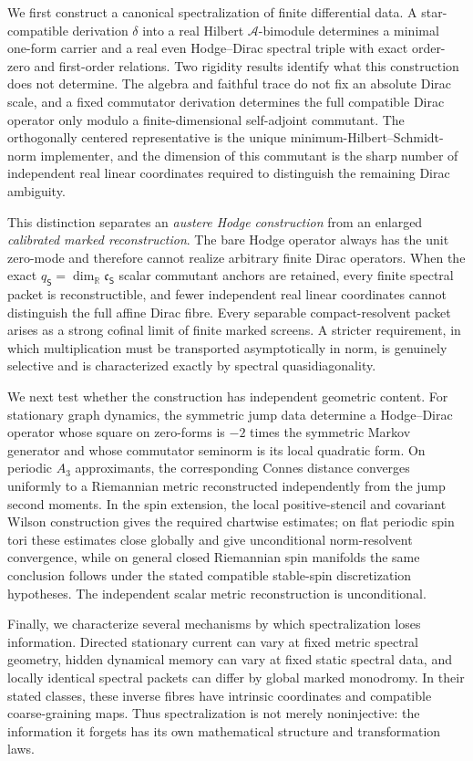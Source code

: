\documentclass[11pt]{article}
\theoremstyle{definition}
\theoremstyle{remark}
\theoremstyle{definition}
\theoremstyle{remark}
\newcommand{\R}{\mathbb R}
\newcommand{\A}{\mathcal A}
\begin{document}
We first construct a canonical spectralization of finite differential data. A
star-compatible derivation $\delta$ into a real Hilbert $\A$-bimodule determines
a minimal one-form carrier and a real even Hodge--Dirac spectral triple with exact
order-zero and first-order relations. Two rigidity results identify what this
construction does not determine. The algebra and faithful trace do not fix an
absolute Dirac scale, and a fixed commutator derivation determines the full
compatible Dirac operator only modulo a finite-dimensional self-adjoint commutant.
The orthogonally centered representative is the unique
minimum-Hilbert--Schmidt-norm implementer, and the dimension of this commutant is
the sharp number of independent real linear coordinates required to distinguish the
remaining Dirac ambiguity.

This distinction separates an \emph{austere Hodge construction} from an enlarged
\emph{calibrated marked reconstruction}. The bare Hodge operator always has the
unit zero-mode and therefore cannot realize arbitrary finite Dirac operators.
When the exact $q_{\mathsf S}=\dim_{\R}\mathfrak c_{\mathsf S}$ scalar
commutant anchors are retained, every finite spectral packet is reconstructible,
and fewer independent real linear coordinates cannot distinguish the full affine Dirac fibre.  Every
separable compact-resolvent packet arises as a strong cofinal limit of finite
marked screens. A stricter requirement,
in which multiplication must be transported asymptotically in norm, is genuinely
selective and is characterized exactly by spectral quasidiagonality.

We next test whether the construction has independent geometric content. For
stationary graph dynamics, the symmetric jump data determine a Hodge--Dirac
operator whose square on zero-forms is $-2$ times the symmetric Markov generator and whose commutator
seminorm is its local quadratic form. On periodic $A_3$ approximants, the
corresponding Connes distance converges uniformly to a Riemannian metric
reconstructed independently from the jump second moments. In the spin extension, the local positive-stencil and covariant Wilson construction gives
the required chartwise estimates; on flat periodic spin tori these estimates close
globally and give unconditional norm-resolvent convergence, while on general closed
Riemannian spin manifolds the same conclusion follows under the stated compatible
stable-spin discretization hypotheses. The independent scalar metric reconstruction
is unconditional.

Finally, we characterize several mechanisms by which spectralization loses
information. Directed stationary current can vary at fixed metric spectral
geometry, hidden dynamical memory can vary at fixed static spectral data, and
locally identical spectral packets can differ by global marked monodromy. In their stated classes, these
inverse fibres have intrinsic coordinates and compatible coarse-graining maps.
Thus spectralization is not merely noninjective: the information it forgets has
its own mathematical structure and transformation laws.
\end{document}
